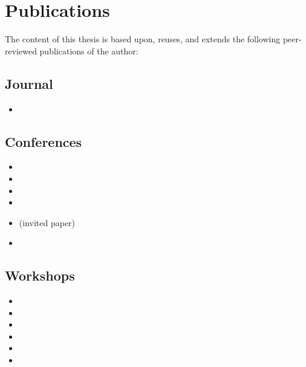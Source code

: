 \section{Publications}

The content of this thesis is based upon, reuses, and extends the following peer-reviewed publications of the author:

\subsection{Journal}

\begin{itemize}
\item[\cite{Devroey2015a}] 
\end{itemize}

\subsection{Conferences}

\begin{itemize}
\item[\cite{Devroey2012}] 
\item[\cite{Devroey2014f}] 
\item[\cite{Devroey2014e}] 
\item[\cite{Devroey2016a}] 
\item[\cite{Legay2017}]  (invited paper)
\item[\cite{Devroey2017}] 
\end{itemize}


\subsection{Workshops}

\begin{itemize}
\item[\cite{Devroey2014}] 
\item[\cite{Devroey2014c}] 
\item[\cite{Devroey2015b}] 
\item[\cite{Devroey2015c}] 
\item[\cite{Devroey2016}] 
\item[\cite{Halin2017}] 
\end{itemize}

